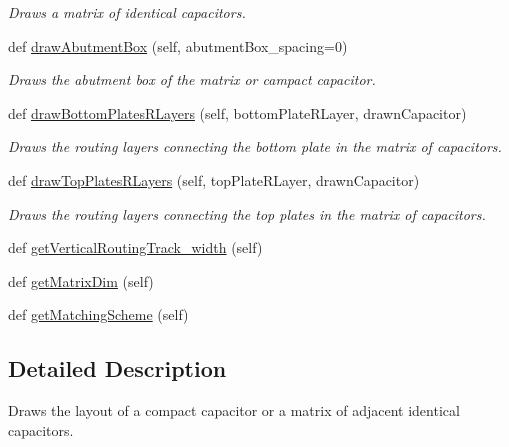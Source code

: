 \begin{DoxyCompactItemize}
\begin{DoxyCompactList}\small\item\em Draws a matrix of identical capacitors. \end{DoxyCompactList}\item 
def \mbox{\hyperlink{classpython_1_1capacitormatrix_1_1CapacitorStack_a8ff901c4f22ccba4e7fc19f9ce98109e}{draw\+Abutment\+Box}} (self, abutment\+Box\+\_\+spacing=0)
\begin{DoxyCompactList}\small\item\em Draws the abutment box of the matrix or campact capacitor. \end{DoxyCompactList}\item 
def \mbox{\hyperlink{classpython_1_1capacitormatrix_1_1CapacitorStack_afd56ae8981043c8ef680d0c7ac0a3acb}{draw\+Bottom\+Plates\+R\+Layers}} (self, bottom\+Plate\+R\+Layer, drawn\+Capacitor)
\begin{DoxyCompactList}\small\item\em Draws the routing layers connecting the bottom plate in the matrix of capacitors. \end{DoxyCompactList}\item 
def \mbox{\hyperlink{classpython_1_1capacitormatrix_1_1CapacitorStack_ac4f954eb981ca22afd05d15d24054c78}{draw\+Top\+Plates\+R\+Layers}} (self, top\+Plate\+R\+Layer, drawn\+Capacitor)
\begin{DoxyCompactList}\small\item\em Draws the routing layers connecting the top plates in the matrix of capacitors. \end{DoxyCompactList}\item 
def \mbox{\hyperlink{classpython_1_1capacitormatrix_1_1CapacitorStack_a306f64ae38c4f512855ec9b276f47232}{get\+Vertical\+Routing\+Track\+\_\+width}} (self)
\item 
def \mbox{\hyperlink{classpython_1_1capacitormatrix_1_1CapacitorStack_a7c13ac996df61c10e7249efa4b26a39d}{get\+Matrix\+Dim}} (self)
\item 
def \mbox{\hyperlink{classpython_1_1capacitormatrix_1_1CapacitorStack_a47fab36d1c5f43b77f6a8bed838f489c}{get\+Matching\+Scheme}} (self)
\end{DoxyCompactItemize}


\subsection{Detailed Description}
Draws the layout of a compact capacitor or a matrix of adjacent identical capacitors. 

